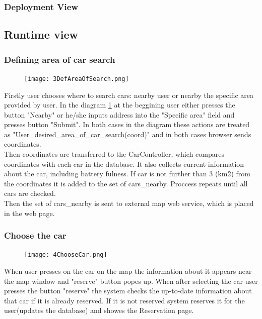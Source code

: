 \documentclass[12pt, letterpaper]{article}
\begin{document}
\subsubsection{Deployment View} 
\newpage
\subsection{Runtime view}
\subsubsection{Defining area of car search}
\begin{figure}[H]
\centering
\texttt{[image: 3DefAreaOfSearch.png]} %
\label{fig:3DefAreaOfSearch}
\end{figure}
\newpage
Firstly user chooses where to search cars: nearby user or nearby the specific area provided by user. In the diagram \ref{fig:3DefAreaOfSearch} at the beggining user either presses the button "Nearby" or he/she inputs address into the "Specific area" field and presses button "Submit". In both cases in the diagram these actions are treated as "User\_desired\_area\_of\_car\_search(coord)" and in both cases browser sends coordinates. \\
Then coordinates are transferred to the CarController, which compares coordinates with each car in the database. It also collects current information about the car, including battery fulness.  If car is not further than 3 (km\^2) from the coordinates it is added to the set of cars\_nearby. Proccess repeats until all cars are checked. \\
Then the set of cars\_nearby is sent to external map web service, which is placed in the web page.  
\newpage
\subsubsection{Choose the car}
\begin{figure}[H]
\centering
\texttt{[image: 4ChooseCar.png]} %
\label{fig:4ChooseCar}
\end{figure}
\newpage
When user presses on the car on the map the information about it appears near the map window and "reserve" button popes up. When after selecting the car user presses the button "reserve" the system checks the up-to-date information about that car if it is already reserved. If it is not reserved system reserves it for the user(updates the database) and showes the Reservation page.  
\newpage
\end{document}
